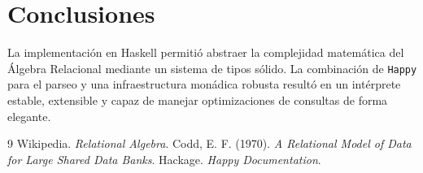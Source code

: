 \documentclass[12pt]{report}
\begin{document}
\chapter{Conclusiones}
La implementación en Haskell permitió abstraer la complejidad matemática del Álgebra Relacional mediante un sistema de tipos sólido. La combinación de \texttt{Happy} para el parseo y una infraestructura monádica robusta resultó en un intérprete estable, extensible y capaz de manejar optimizaciones de consultas de forma elegante.

\begin{thebibliography}{9}
 Wikipedia. \textit{Relational Algebra}.
 Codd, E. F. (1970). \textit{A Relational Model of Data for Large Shared Data Banks}.
 Hackage. \textit{Happy Documentation}.
\end{thebibliography}
\end{document}

